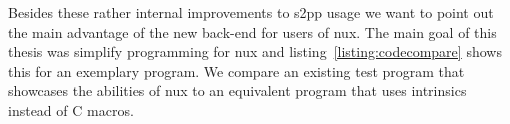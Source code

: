 Besides these rather internal improvements to s2pp usage we want to point out the main advantage of the new back-end for users of nux.
The main goal of this thesis was simplify programming for nux and listing~\ref{listing:codecompare} shows this for an exemplary program.
We compare an existing test program that showcases the abilities of nux to an equivalent program that uses intrinsics instead of C macros.




